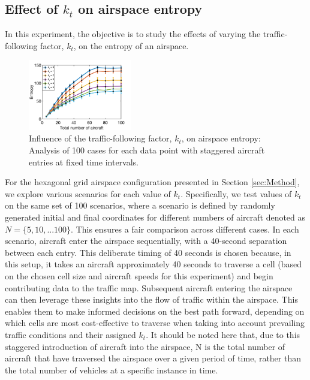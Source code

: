 \documentclass[conference, letter]{IEEEtran}
\begin{document}
\subsection{Effect of $k_t$ on airspace entropy} \label{sec:effects_k_t}

In this experiment, the objective is to study the effects of varying the traffic-following factor, $k_t$, on the entropy of an airspace. 

\begin{figure}[hbt!]
\centering
\includegraphics[width=0.4\textwidth]{varying_k_t2.png}
\caption{Influence of the traffic-following factor, $k_t$, on airspace entropy: Analysis of 100 cases for each data point with staggered aircraft entries at fixed time intervals.}
\label{varying_k_t}
\end{figure}

For the hexagonal grid airspace configuration presented in Section \ref{sec:Method}, we explore various scenarios for each value of $k_t$. Specifically, we test values of $k_t$ on the same set of 100 scenarios, where a scenario is defined by randomly generated initial and final coordinates for different numbers of aircraft denoted as $N = \{5, 10, ... 100\}$. This ensures a fair comparison across different cases. In each scenario, aircraft enter the airspace sequentially, with a 40-second separation between each entry. This deliberate timing of 40 seconds is chosen because, in this setup, it takes an aircraft approximately 40 seconds to traverse a cell (based on the chosen cell size and aircraft speeds for this experiment) and begin contributing data to the traffic map. Subsequent aircraft entering the airspace can then leverage these insights into the flow of traffic within the airspace. This enables them to make informed decisions on the best path forward, depending on which cells are most cost-effective to traverse when taking into account prevailing traffic conditions and their assigned $k_t$. It should be noted here that, due to this staggered introduction of aircraft into the airspace, N is the total number of aircraft that have traversed the airspace over a given period of time, rather than the total number of vehicles at a specific instance in time. 
\end{document}
